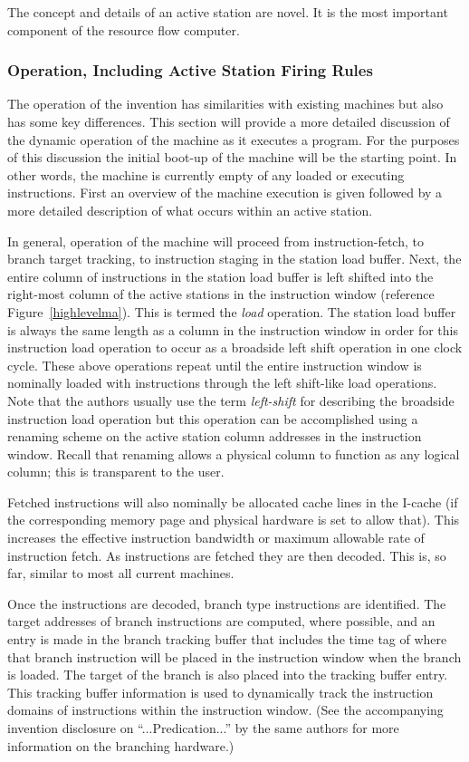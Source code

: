 \documentclass[10pt,dvips]{article}
\begin{document}
The concept and details of an active station are novel. It is the most
important component of
the resource flow computer.

\subsubsection{Operation, Including Active Station Firing Rules}
The operation of the invention has similarities with existing
machines but also has some key differences.  This section will provide
a more detailed discussion of the dynamic operation of the machine as
it executes a program.  For the purposes of this discussion the initial
boot-up of the machine will be the starting point.  In other words, the
machine is currently empty of any loaded or executing instructions.
First an overview of the machine execution is given followed by a more
detailed description of what occurs within an active station.

In general, operation of the machine will proceed from
instruction-fetch, to branch target tracking, to instruction staging in
the station load buffer.  Next, the entire column of instructions in
the station load buffer is left shifted into the right-most column
of the active stations in the instruction window (reference
Figure~\ref{highlevelma}).
This is termed the {\it load} operation.  The
station load buffer is always the same length as a column in the
instruction window in order for this instruction load operation to
occur as a broadside left shift operation in one clock cycle.
These above operations
repeat until the entire instruction window is nominally loaded with
instructions through the left shift-like load operations.  Note that
the authors usually use the term {\it left-shift} for describing the
broadside instruction load operation but this operation can be
accomplished using a renaming scheme on the active station column
addresses in the instruction window. Recall that renaming allows a
physical column to function as any logical column; this is
transparent to the user.

Fetched instructions will also nominally be allocated cache lines in
the I-cache (if the corresponding memory page and physical hardware is
set to allow that).  This increases the effective instruction bandwidth
or maximum allowable rate of instruction fetch.
As instructions are fetched they are then
decoded.  This is, so far, similar to most all current machines.

Once the instructions are decoded, branch type instructions are
identified.  The target addresses of branch instructions are computed,
where possible, and an entry is made in the branch tracking buffer that
includes the time tag of where that branch instruction will be placed
in the instruction window when the branch is loaded.  The target of
the branch is also placed into the tracking buffer entry.  This
tracking buffer information is used to dynamically track the
instruction domains of instructions within the instruction window.
(See the accompanying invention disclosure on ``...Predication...''
by the same authors for more information on the branching hardware.)
\end{document}
